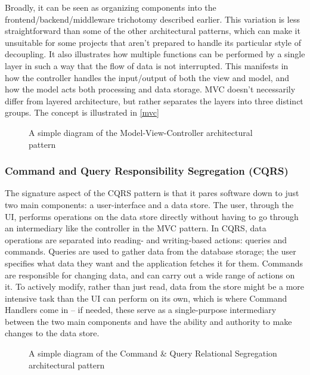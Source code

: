 Broadly, it can be seen as organizing components into the frontend/backend/middleware trichotomy described earlier. This variation is less straightforward than some of the other architectural patterns, which can make it unsuitable for some projects that aren't prepared to handle its particular style of decoupling. It also illustrates how multiple functions can be performed by a single layer in such a way that the flow of data is not interrupted. This manifests in how the controller handles the input/output of both the view and model, and how the model acts both processing and data storage. MVC doesn't necessarily differ from layered architecture, but rather separates the layers into three distinct groups. The concept is illustrated in \autoref{mvc}

\begin{figure}[!ht]
\begin{center}
\caption{A simple diagram of the Model-View-Controller architectural pattern}\label{mvc}
\end{center}
\end{figure}

\subsubsection{Command and Query Responsibility Segregation (CQRS)}

The signature aspect of the CQRS pattern is that it pares software down to just two main components: a user-interface and a data store. The user, through the UI, performs operations on the data store directly without having to go through an intermediary like the controller in the MVC pattern. In CQRS, data operations are separated into reading- and writing-based actions: queries and commands. Queries are used to gather data from the database storage; the user specifies what data they want and the application fetches it for them. Commands are responsible for changing data, and can carry out a wide range of actions on it. To actively modify, rather than just read, data from the store might be a more intensive task than the UI can perform on its own, which is where Command Handlers come in \cite{ghidersa_software_2022} -- if needed, these serve as a single-purpose intermediary between the two main components and have the ability and authority to make changes to the data store.

\begin{figure}[!ht]
	\begin{center}
		\caption{A simple diagram of the Command \& Query Relational Segregation architectural pattern}\label{cqrs}
	\end{center}
\end{figure}


